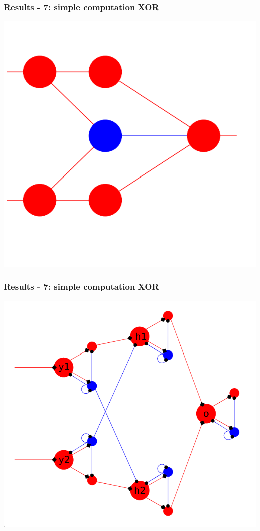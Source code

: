 \documentclass{beamer}
\begin{document}
\begin{frame}
    \frametitle{Results - 7: simple computation XOR}
    \includegraphics[width=\textwidth]{figures/XOR-suggestion.png}
\end{frame}

\begin{frame}
    \frametitle{Results - 7: simple computation XOR}
    \includegraphics[width=.7\textwidth]{figures/XOR-used.png}
\end{frame}
\end{document}
